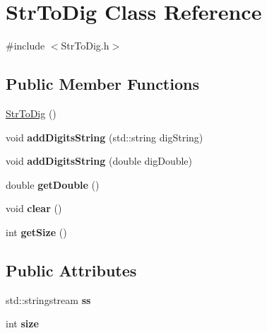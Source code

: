\hypertarget{class_str_to_dig}{}\section{Str\+To\+Dig Class Reference}
\label{class_str_to_dig}


{\ttfamily \#include $<$Str\+To\+Dig.\+h$>$}

\subsection*{Public Member Functions}
\begin{DoxyCompactItemize}
\item 
\hyperlink{class_str_to_dig_abdd16d53d16907eeaf6026097c38658f}{Str\+To\+Dig} ()
\item 
\hypertarget{class_str_to_dig_a77478d5ac1f4dca2c1cbecda407fbf56}{}void {\bfseries add\+Digits\+String} (std\+::string dig\+String)\label{class_str_to_dig_a77478d5ac1f4dca2c1cbecda407fbf56}

\item 
\hypertarget{class_str_to_dig_af20b09f86e90d18f83c4c87e6f34cc1e}{}void {\bfseries add\+Digits\+String} (double dig\+Double)\label{class_str_to_dig_af20b09f86e90d18f83c4c87e6f34cc1e}

\item 
\hypertarget{class_str_to_dig_afbb98b1ef5730992ec6fcacf024f575d}{}double {\bfseries get\+Double} ()\label{class_str_to_dig_afbb98b1ef5730992ec6fcacf024f575d}

\item 
\hypertarget{class_str_to_dig_a5a53d889ec55a4be20a6007d0e9df2b6}{}void {\bfseries clear} ()\label{class_str_to_dig_a5a53d889ec55a4be20a6007d0e9df2b6}

\item 
\hypertarget{class_str_to_dig_a3a913de6f12f2773283eaa18c66d5749}{}int {\bfseries get\+Size} ()\label{class_str_to_dig_a3a913de6f12f2773283eaa18c66d5749}

\end{DoxyCompactItemize}
\subsection*{Public Attributes}
\begin{DoxyCompactItemize}
\item 
\hypertarget{class_str_to_dig_aad04956b7e82a5747c5bff326847c361}{}std\+::stringstream {\bfseries ss}\label{class_str_to_dig_aad04956b7e82a5747c5bff326847c361}

\item 
\hypertarget{class_str_to_dig_a8a3a32b98e04f6e418c1218c97b9cf54}{}int {\bfseries size}\label{class_str_to_dig_a8a3a32b98e04f6e418c1218c97b9cf54}

\end{DoxyCompactItemize}


